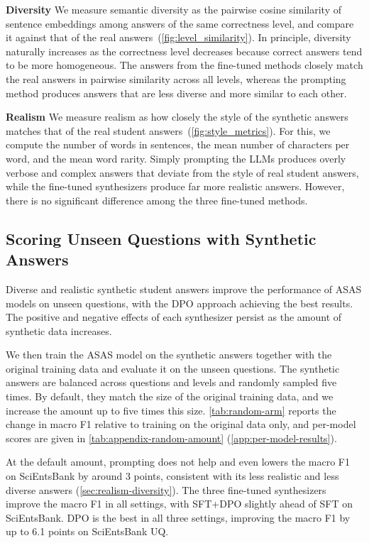 \noindent\textbf{Diversity} We measure semantic diversity as the pairwise cosine similarity of sentence embeddings among answers of the same correctness level, and compare it against that of the real answers~(\autoref{fig:level_similarity}). In principle, diversity naturally increases as the correctness level decreases because correct answers tend to be more homogeneous. The answers from the fine-tuned methods closely match the real answers in pairwise similarity across all levels, whereas the prompting method produces answers that are less diverse and more similar to each other.

\noindent\textbf{Realism} We measure realism as how closely the style of the synthetic answers matches that of the real student answers~(\autoref{fig:style_metrics}). For this, we compute the number of words in sentences, the mean number of characters per word, and the mean word rarity. Simply prompting the LLMs produces overly verbose and complex answers that deviate from the style of real student answers, while the fine-tuned synthesizers produce far more realistic answers. However, there is no significant difference among the three fine-tuned methods.

\subsection{Scoring Unseen Questions with Synthetic Answers}
\label{sec:scoring-unseen}

\vspace{0.5ex}
\noindent\colorbox{gray!15}{\parbox{\dimexpr\linewidth-2\fboxsep\relax}{%
Diverse and realistic synthetic student answers improve the performance of ASAS models on unseen questions, with the DPO approach achieving the best results. The positive and negative effects of each synthesizer persist as the amount of synthetic data increases.}}

We then train the ASAS model on the synthetic answers together with the original training data and evaluate it on the unseen questions. The synthetic answers are balanced across questions and levels and randomly sampled five times. By default, they match the size of the original training data, and we increase the amount up to five times this size. \autoref{tab:random-arm} reports the change in macro F1 relative to training on the original data only, and per-model scores are given in \autoref{tab:appendix-random-amount} (\autoref{app:per-model-results}).

At the default amount, prompting does not help and even lowers the macro F1 on SciEntsBank by around 3 points, consistent with its less realistic and less diverse answers (\autoref{sec:realism-diversity}). The three fine-tuned synthesizers improve the macro F1 in all settings, with SFT+DPO slightly ahead of SFT on SciEntsBank. DPO is the best in all three settings, improving the macro F1 by up to 6.1 points on SciEntsBank UQ.


